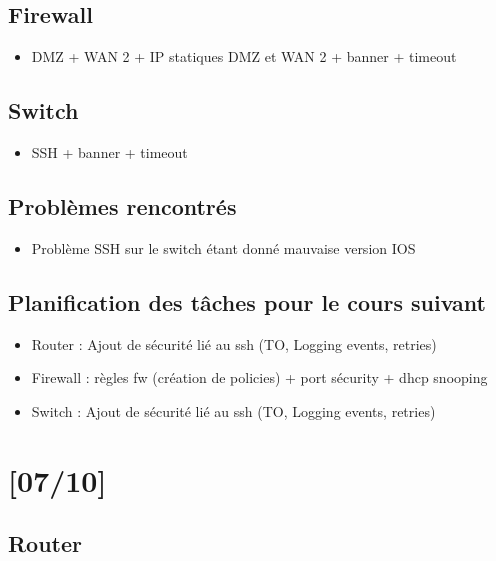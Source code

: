 \documentclass{article}
\begin{document}
\subsection{Firewall}


\begin{itemize}

\item DMZ + WAN 2 + IP statiques DMZ et WAN 2 + banner + timeout
\end{itemize} 

\subsection{Switch}

\begin{itemize}

\item SSH + banner + timeout
\end{itemize} 

\subsection{Problèmes rencontrés}
\begin{itemize}

\item Problème SSH sur le switch étant donné mauvaise version IOS

\end{itemize} 

\subsection{Planification des tâches pour le cours suivant}
\begin{itemize}


\item Router : Ajout de sécurité lié au ssh (TO, Logging events, retries)
\item Firewall : règles fw (création de policies) + port sécurity + dhcp snooping
\item Switch : Ajout de sécurité lié au ssh (TO, Logging events, retries)
\end{itemize} 

\newpage
\section{[07/10]}

\subsection{Router}
\end{document}
